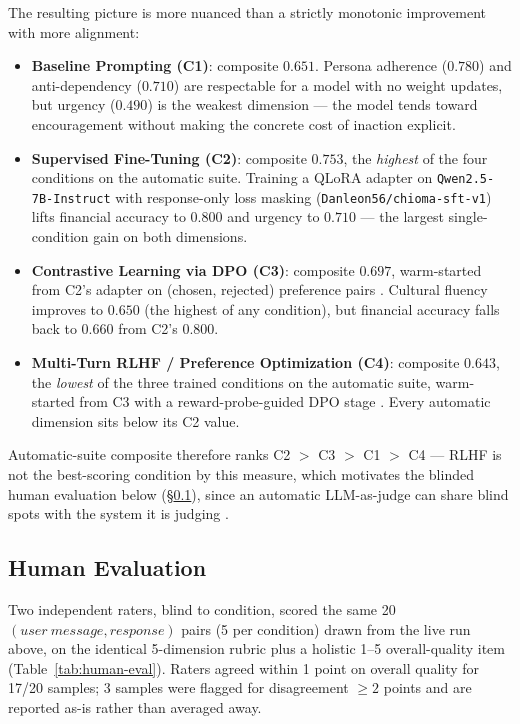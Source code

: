 The resulting picture is more nuanced than a strictly monotonic improvement with more alignment:
\begin{itemize}
    \item \textbf{Baseline Prompting (C1)}: composite $0.651$. Persona adherence ($0.780$) and anti-dependency ($0.710$) are respectable for a model with no weight updates, but urgency ($0.490$) is the weakest dimension — the model tends toward encouragement without making the concrete cost of inaction explicit.
    \item \textbf{Supervised Fine-Tuning (C2)}: composite $0.753$, the \emph{highest} of the four conditions on the automatic suite. Training a QLoRA adapter on \texttt{Qwen2.5-7B-Instruct} with response-only loss masking (\texttt{Danleon56/chioma-sft-v1}) lifts financial accuracy to $0.800$ and urgency to $0.710$ — the largest single-condition gain on both dimensions.
    \item \textbf{Contrastive Learning via DPO (C3)}: composite $0.697$, warm-started from C2's adapter on (chosen, rejected) preference pairs \citep{rafailov2023dpo}. Cultural fluency improves to $0.650$ (the highest of any condition), but financial accuracy falls back to $0.660$ from C2's $0.800$.
    \item \textbf{Multi-Turn RLHF / Preference Optimization (C4)}: composite $0.643$, the \emph{lowest} of the three trained conditions on the automatic suite, warm-started from C3 with a reward-probe-guided DPO stage \citep{abdulhai2025personas,ouyang2022instructgpt}. Every automatic dimension sits below its C2 value.
\end{itemize}

Automatic-suite composite therefore ranks C2 $>$ C3 $>$ C1 $>$ C4 — RLHF is not the best-scoring condition by this measure, which motivates the blinded human evaluation below (\S\ref{subsec:human-eval}), since an automatic LLM-as-judge can share blind spots with the system it is judging \citep{han2025illusion}.

\subsection{Human Evaluation}
\label{subsec:human-eval}

Two independent raters, blind to condition, scored the same 20 $(user\ message, response)$ pairs (5 per condition) drawn from the live run above, on the identical 5-dimension rubric plus a holistic 1--5 overall-quality item (Table~\ref{tab:human-eval}). Raters agreed within 1 point on overall quality for 17/20 samples; 3 samples were flagged for disagreement $\geq 2$ points and are reported as-is rather than averaged away.

